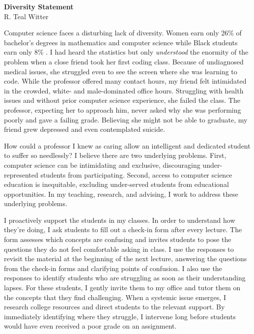 \documentclass[11pt]{article}
\begin{document}
\begin{center}
	\Large \textbf{Diversity Statement} \\
	\vspace{.25em}
	\large{R. {\color{teal}Teal} Witter}
\end{center}

Computer science faces a disturbing lack of diversity.
Women earn only 26\% of bachelor's degrees in mathematics and computer science while Black students earn only 8\% \cite{national2023diversity}.
I had heard the statistics but only \textit{understood} the enormity of the problem when a close friend took her first coding class.
Because of undiagnosed medical issues, she struggled even to see the screen where she was learning to code.
While the professor offered many contact hours, my friend felt intimidated in the crowded, white- and male-dominated office hours.
Struggling with health issues and without prior computer science experience, she failed the class.
The professor, expecting her to approach him, never asked why she was performing poorly and gave a failing grade.
Believing she might not be able to graduate, my friend grew depressed and even contemplated suicide.

How could a professor I knew as caring allow an intelligent and dedicated student to suffer so needlessly?
I believe there are two underlying problems.
First, computer science can be intimidating and exclusive, discouraging under-represented students from participating.
Second, access to computer science education is inequitable, excluding under-served students from educational opportunities.
In my teaching, research, and advising, I work to address these underlying problems.


I proactively support the students in my classes.
In order to understand how they're doing, I ask students to fill out a check-in form after every lecture.
The form assesses which concepts are confusing and invites students to pose the questions they do not feel comfortable asking in class.
I use the responses to revisit the material at the beginning of the next lecture, answering the questions from the check-in forms and clarifying points of confusion.
I also use the responses to identify students who are struggling as soon as their understanding lapses.
For these students, I gently invite them to my office and tutor them on the concepts that they find challenging.
When a systemic issue emerges, I research college resources and direct students to the relevant support.
By immediately identifying where they struggle, I intervene long before students would have even received a poor grade on an assignment.
\end{document}
